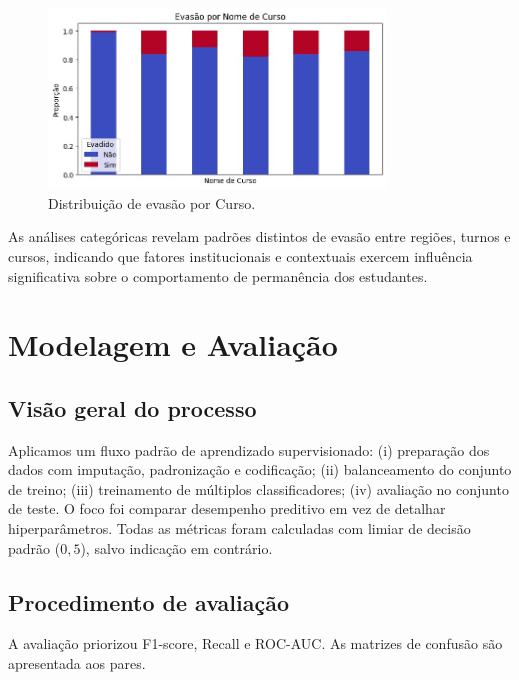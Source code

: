 \documentclass[english, spanish, brazilian]{RBIEarticle} %
\begin{document}
\begin{figure}[H]\centering
	\includegraphics[width=0.8\textwidth]{images/evasao-nome-curso.jpeg}
	\caption{Distribuição de evasão por Curso.}
	\label{fig:cat-curso-hist}
\end{figure}

As análises categóricas revelam padrões distintos de evasão entre regiões, turnos e cursos, indicando que fatores institucionais e contextuais exercem influência significativa sobre o comportamento de permanência dos estudantes.


\section{Modelagem e Avaliação}

\subsection{Visão geral do processo}

Aplicamos um fluxo padrão de aprendizado supervisionado: (i) preparação dos dados com imputação, padronização e codificação; (ii) balanceamento do conjunto de treino; (iii) treinamento de múltiplos classificadores; (iv) avaliação no conjunto de teste. O foco foi comparar desempenho preditivo em vez de detalhar hiperparâmetros. Todas as métricas foram calculadas com limiar de decisão padrão ($0{,}5$), salvo indicação em contrário.

\subsection{Procedimento de avaliação}
A avaliação priorizou F1-score, Recall e ROC-AUC. As matrizes de confusão são apresentada aos pares.
\end{document}
